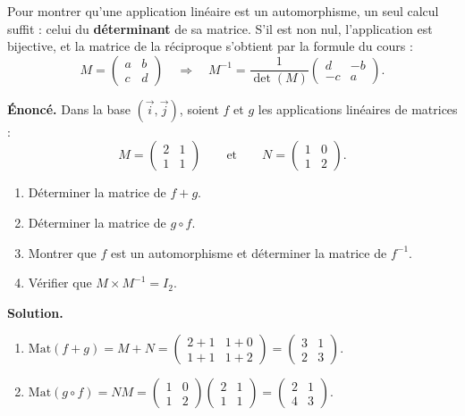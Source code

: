 \documentclass[11pt]{article}
\begin{document}
\begin{aretenir}
Pour montrer qu'une application linéaire est un automorphisme, un seul calcul suffit : celui du \textbf{déterminant} de sa matrice. S'il est non nul, l'application est bijective, et la matrice de la réciproque s'obtient par la formule du cours :
\[ M = \begin{pmatrix} a & b \\ c & d \end{pmatrix} \quad\Longrightarrow\quad M^{-1} = \frac{1}{\det(M)}\begin{pmatrix} d & -b \\ -c & a \end{pmatrix}. \]
\end{aretenir}

\begin{exoresolu}
\textbf{Énoncé.} Dans la base $(\vec{i},\vec{j})$, soient $f$ et $g$ les applications linéaires de matrices :
\[ M = \begin{pmatrix} 2 & 1 \\ 1 & 1 \end{pmatrix} \qquad \text{et} \qquad N = \begin{pmatrix} 1 & 0 \\ 1 & 2 \end{pmatrix}. \]
\begin{enumerate}
\item Déterminer la matrice de $f + g$.
\item Déterminer la matrice de $g \circ f$.
\item Montrer que $f$ est un automorphisme et déterminer la matrice de $f^{-1}$.
\item Vérifier que $M \times M^{-1} = I_2$.
\end{enumerate}
\tcblower
\textbf{Solution.}
\begin{enumerate}
\item $\mathrm{Mat}(f+g) = M + N = \begin{pmatrix} 2+1 & 1+0 \\ 1+1 & 1+2 \end{pmatrix} = \begin{pmatrix} 3 & 1 \\ 2 & 3 \end{pmatrix}$.
\item $\mathrm{Mat}(g\circ f) = NM = \begin{pmatrix} 1 & 0 \\ 1 & 2 \end{pmatrix}\begin{pmatrix} 2 & 1 \\ 1 & 1 \end{pmatrix} = \begin{pmatrix} 2 & 1 \\ 4 & 3 \end{pmatrix}$.

\end{enumerate}
\end{exoresolu}
\end{document}
